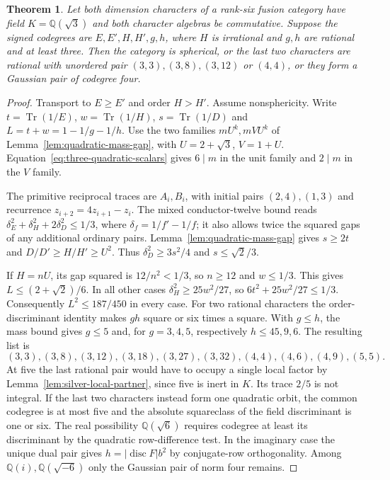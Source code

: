 \documentclass[11pt,reqno]{amsart}
\newtheorem{theorem}{Theorem}[section]
\theoremstyle{remark}\newtheorem{remark}[theorem]{Remark}
\numberwithin{equation}{section}
\begin{document}
\begin{theorem}\label{thm:quadratic-twelve-upstream}
Let both dimension characters of a rank-six fusion category have
field $K=\mathbb Q(\sqrt3)$ and both character algebras be commutative.
Suppose the signed codegrees are $E,E',H,H',g,h$, where $H$ is
irrational and $g,h$ are rational and at least three. Then the
category is spherical, or the last two characters are rational with
unordered pair $(3,3),(3,8),(3,12)$ or $(4,4)$, or they form a
Gaussian pair of codegree four.
\end{theorem}
\begin{proof}
Transport to $E\ge E'$ and order $H>H'$. Assume nonsphericity.
Write $t=\operatorname{Tr}(1/E)$, $w=\operatorname{Tr}(1/H)$,
$s=\operatorname{Tr}(1/D)$ and $L=t+w=1-1/g-1/h$. Use the two families $mU^k,mVU^k$ of Lemma~\ref{lem:quadratic-mass-gap},
with $U=2+\sqrt3$, $V=1+U$.
Equation~\eqref{eq:three-quadratic-scalars}
gives $6\mid m$ in the unit family and $2\mid m$ in the $V$ family.

The primitive reciprocal traces are $A_i,B_i$,
with initial pairs $(2,4),(1,3)$ and recurrence $z_{i+2}=4z_{i+1}-z_i$.
The mixed conductor-twelve bound reads
$\delta_E^2+\delta_H^2+2\delta_D^2\le1/3$, where
$\delta_f=1/f'-1/f$; it also allows twice the squared gaps of any
additional ordinary pairs. Lemma~\ref{lem:quadratic-mass-gap} gives $s\ge2t$ and
$D/D'\ge H/H'\ge U^2$. Thus $\delta_D^2\ge3s^2/4$ and $s\le\sqrt2/3$.

If $H=nU$, its gap squared is $12/n^2<1/3$, so $n\ge12$ and
$w\le1/3$. This gives $L\le(2+\sqrt2)/6$. In all other cases
$\delta_H^2\ge25w^2/27$, so $6t^2+25w^2/27\le1/3$.
Consequently $L^2\le187/450$ in every case. For two rational
characters the order-discriminant identity makes $gh$ square or
six times a square. With $g\le h$, the mass bound gives $g\le5$
and, for $g=3,4,5$, respectively $h\le45,9,6$. The resulting
list is
\[
 (3,3),(3,8),(3,12),(3,18),(3,27),(3,32),
 (4,4),(4,6),(4,9),(5,5).
\]
At five the last rational pair would have to occupy a single local
factor by Lemma~\ref{lem:silver-local-partner}, since five is inert
in $K$. Its trace $2/5$ is not integral. If the last two characters
instead form one quadratic orbit, the common codegree is at most
five and the absolute squareclass of the field discriminant is one
or six. The real possibility $\mathbb Q(\sqrt6)$ requires codegree
at least its discriminant by the quadratic row-difference test.
In the imaginary case the unique dual pair gives $h=|\operatorname{disc}F|b^2$
by conjugate-row orthogonality. Among $\mathbb Q(i),\mathbb Q(\sqrt{-6})$
only the Gaussian pair of norm four remains.


\end{proof}
\end{document}
